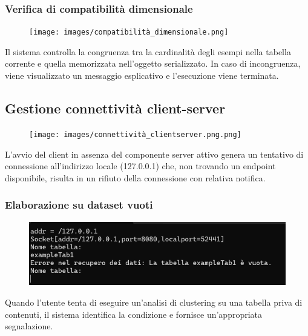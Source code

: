 \subsubsection{Verifica di compatibilità dimensionale} 
    \begin{figure}[h!]
        \centering
        \texttt{[image: images/compatibilità\_dimensionale.png]}
    \end{figure}
    Il sistema controlla la congruenza tra la cardinalità degli esempi nella tabella corrente e quella memorizzata nell'oggetto serializzato. In caso di incongruenza, viene visualizzato un messaggio esplicativo e l'esecuzione viene terminata.

\subsection{Gestione connettività client-server}
\begin{figure}[h!]
    \centering
    \texttt{[image: images/connettività\_clientserver.png.png]}
\end{figure}
L'avvio del client in assenza del componente server attivo genera un tentativo di connessione all'indirizzo locale (127.0.0.1) che, non trovando un endpoint disponibile, risulta in un rifiuto della connessione con relativa notifica.

\subsubsection{Elaborazione su dataset vuoti} 
    \begin{figure}[h!]
        \centering
        \includegraphics[width=\textwidth]{images/dataset_vuoti.png}
    \end{figure}

Quando l'utente tenta di eseguire un'analisi di clustering su una tabella priva di contenuti, il sistema identifica la condizione e fornisce un'appropriata segnalazione.

